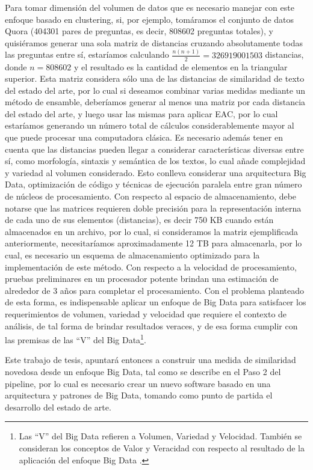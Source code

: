 \bigskip Para tomar dimensión del volumen de datos que es necesario manejar con este enfoque basado en clustering, si, por ejemplo, tomáramos el conjunto de datos Quora (404301 pares de preguntas, es decir, 808602 preguntas totales), y quisiéramos generar una sola matriz de distancias cruzando absolutamente todas las preguntas entre sí, estaríamos calculando $\frac{n(n+1)}{2} = 326919001503$ distancias, donde $n = 808602$ y el resultado es la cantidad de elementos en la triangular superior. Esta matriz considera sólo una de las distancias de similaridad de texto del estado del arte, por lo cual si deseamos combinar varias medidas mediante un método de ensamble, deberíamos generar al menos una matriz por cada distancia del estado del arte, y luego usar las mismas para aplicar EAC, por lo cual estaríamos generando un número total de cálculos considerablemente mayor al que puede procesar una computadora clásica. Es necesario además tener en cuenta que las distancias pueden llegar a considerar características diversas entre sí, como morfología, sintaxis y semántica de los textos, lo cual añade complejidad y variedad al volumen considerado. Esto conlleva considerar una arquitectura Big Data, optimización de código y técnicas de ejecución paralela entre gran número de núcleos de procesamiento. Con respecto al espacio de almacenamiento, debe notarse que las matrices requieren doble precisión para la representación interna de cada uno de sus elementos (distancias), es decir 750 KB cuando están almacenados en un archivo, por lo cual, si consideramos la matriz ejemplificada anteriormente, necesitaríamos aproximadamente 12 TB para almacenarla, por lo cual, es necesario un esquema de almacenamiento optimizado para la implementación de este método. Con respecto a la velocidad de procesamiento, pruebas preliminares en un procesador potente brindan una estimación de alrededor de 3 años para completar el procesamiento. Con el problema planteado de esta forma, es indispensable aplicar un enfoque de Big Data para satisfacer los requerimientos de volumen, variedad y velocidad que requiere el contexto de análisis, de tal forma de brindar resultados veraces, y de esa forma cumplir con las premisas de las “V” del Big Data\footnote{Las “V” del Big Data refieren a Volumen, Variedad y Velocidad. También se consideran los conceptos de Valor y Veracidad con respecto al resultado de la aplicación del enfoque Big Data \citep{gandomi2015beyond}.}.

\bigskip Este trabajo de tesis, apuntará entonces a construir una medida de similaridad novedosa desde un enfoque Big Data, tal como se describe en el Paso 2 del pipeline, por lo cual es necesario crear un nuevo software basado en una arquitectura y patrones de Big Data, tomando como punto de partida el desarrollo del estado de arte.

